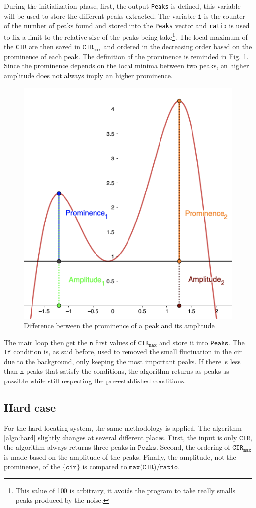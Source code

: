 During the initialization phase, first, the output \texttt{Peaks} is defined, this variable will be used to store the different peaks extracted. The variable \texttt{i} is the counter of the number of peaks found and stored into the \texttt{Peaks} vector and \texttt{ratio} is used to fix a limit to the relative size of the peaks being take\footnote{This value of 100 is arbitrary, it avoids the program to take really smalls peaks produced by the noise.}. The local maximum of the \texttt{CIR} are then saved in $\texttt{CIR}_\texttt{max}$ and ordered in the decreasing order based on the prominence of each peak. The definition of the prominence is reminded in Fig. \ref{fig:prominence}. Since the prominence depends on the local minima between two peaks, an higher amplitude does not always imply an higher prominence.

\begin{figure}[H]
\centering
\includegraphics[width=.3\linewidth]{Images/prominence.png}
\caption{Difference between the prominence of a peak and its amplitude \label{fig:prominence}}
\end{figure}

The main loop then get the $\texttt{n}$ first values of $\texttt{CIR}_\texttt{max}$ and store it into $\texttt{Peaks}$. The $\texttt{If}$ condition is, as said before, used to removed the small fluctuation in the \gls{cir} due to the background, only keeping the most important peaks. If there is less than $\texttt{n}$ peaks that satisfy the conditions, the algorithm returns as peaks as possible while still respecting the pre-established conditions.

\subsection{Hard case}

For the hard locating system, the same methodology is applied. The algorithm \ref{algo:hard} slightly changes at several different places. First, the input is only $\texttt{CIR}$, the algorithm always returns three peaks in $\texttt{Peaks}$. Second, the ordering of $\texttt{CIR}_\texttt{max}$ is made based on the amplitude of the peaks. Finally, the amplitude, not the prominence, of the $\{\texttt{cir}\}$  is compared to $\texttt{max(CIR)}/\texttt{ratio}$.
\vspace{2mm}


